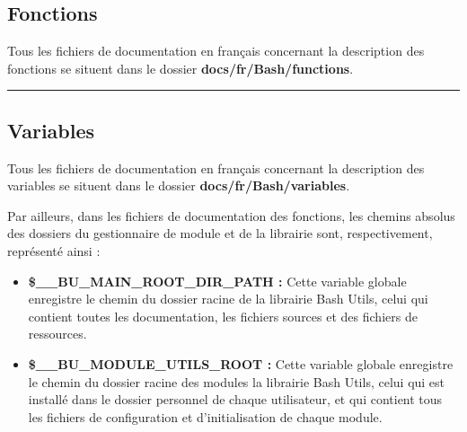 \documentclass[a4paper,10pt]{article}
\begin{document}
\color{sec2}
\subsection{Fonctions}\color{text}

\begin{justify}
    Tous les fichiers de documentation en français concernant la description des fonctions se situent dans le dossier \textbf{\color{path}docs/fr/Bash/functions}.
\end{justify}




\color{sec2}\par\noindent\rule{\textwidth}{0.4pt}\color{text}

\color{sec2}
\subsection{Variables}\color{text}

\begin{justify}
    Tous les fichiers de documentation en français concernant la description des variables se situent dans le dossier \textbf{\color{path}docs/fr/Bash/variables}.
\end{justify}


\begin{justify}
    Par ailleurs, dans les fichiers de documentation des fonctions, les chemins absolus des dossiers du gestionnaire de module et de la librairie sont, respectivement, représenté ainsi :

    \begin{itemize}
        \item \textbf{\color{vars}\$\_\_BU\_MAIN\_ROOT\_DIR\_PATH\color{text} :} Cette variable globale enregistre le chemin du dossier racine de la librairie Bash Utils, celui qui contient toutes les documentation, les fichiers sources et des fichiers de ressources.\\\mbox{}

        \item \textbf{\color{vars}\$\_\_BU\_MODULE\_UTILS\_ROOT\color{text} :} Cette variable globale enregistre le chemin du dossier racine des modules la librairie Bash Utils, celui qui est installé dans le dossier personnel de chaque utilisateur, et qui contient tous les fichiers de configuration et d'initialisation de chaque module.
    \end{itemize}
\end{justify}
\end{document}
